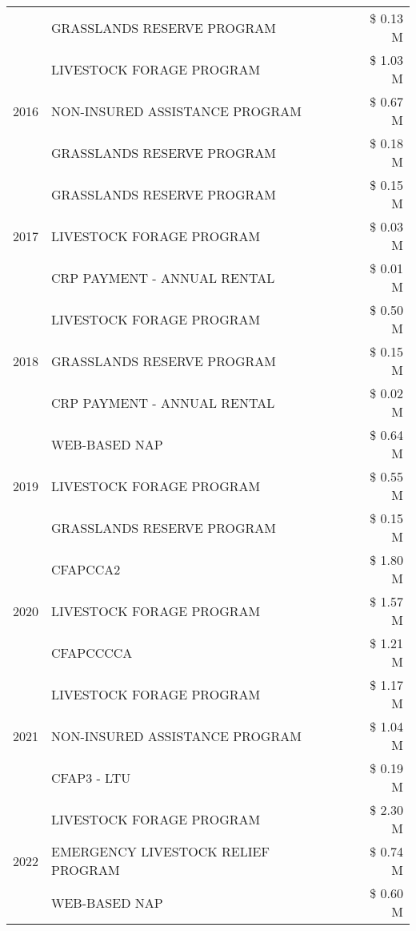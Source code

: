 \begin{tabular}{llr}
 & GRASSLANDS RESERVE PROGRAM & \$ 0.13 M \\
\cline{1-3}
\multirow[t]{3}{*}{2016} & LIVESTOCK FORAGE PROGRAM & \$ 1.03 M \\
 & NON-INSURED ASSISTANCE PROGRAM & \$ 0.67 M \\
 & GRASSLANDS RESERVE PROGRAM & \$ 0.18 M \\
\cline{1-3}
\multirow[t]{3}{*}{2017} & GRASSLANDS RESERVE PROGRAM & \$ 0.15 M \\
 & LIVESTOCK FORAGE PROGRAM & \$ 0.03 M \\
 & CRP PAYMENT - ANNUAL RENTAL & \$ 0.01 M \\
\cline{1-3}
\multirow[t]{3}{*}{2018} & LIVESTOCK FORAGE PROGRAM & \$ 0.50 M \\
 & GRASSLANDS RESERVE PROGRAM & \$ 0.15 M \\
 & CRP PAYMENT - ANNUAL RENTAL & \$ 0.02 M \\
\cline{1-3}
\multirow[t]{3}{*}{2019} & WEB-BASED NAP & \$ 0.64 M \\
 & LIVESTOCK FORAGE PROGRAM & \$ 0.55 M \\
 & GRASSLANDS RESERVE PROGRAM & \$ 0.15 M \\
\cline{1-3}
\multirow[t]{3}{*}{2020} & CFAPCCA2 & \$ 1.80 M \\
 & LIVESTOCK FORAGE PROGRAM & \$ 1.57 M \\
 & CFAPCCCCA & \$ 1.21 M \\
\cline{1-3}
\multirow[t]{3}{*}{2021} & LIVESTOCK FORAGE PROGRAM & \$ 1.17 M \\
 & NON-INSURED ASSISTANCE PROGRAM & \$ 1.04 M \\
 & CFAP3 - LTU & \$ 0.19 M \\
\cline{1-3}
\multirow[t]{3}{*}{2022} & LIVESTOCK FORAGE PROGRAM & \$ 2.30 M \\
 & EMERGENCY LIVESTOCK RELIEF PROGRAM & \$ 0.74 M \\
 & WEB-BASED NAP & \$ 0.60 M \\
\cline{1-3}
\bottomrule
\end{tabular}
